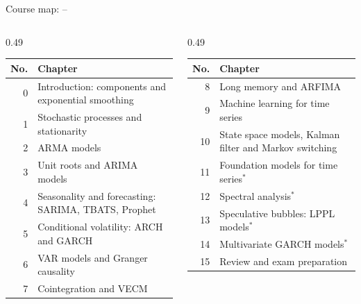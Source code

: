 \begin{frame}{Course map: --}
\itemsize{\footnotesize}
\begin{columns}[T]
\begin{column}{0.49\textwidth}
\begin{center}
\footnotesize
\begin{tabular}{r>{\raggedright\arraybackslash}p{5.6cm}}
\toprule
\textbf{No.} & \textbf{Chapter} \\
\midrule
0 & Introduction: components and exponential smoothing \\
1 & Stochastic processes and stationarity \\
2 & ARMA models \\
3 & Unit roots and ARIMA models \\
4 & Seasonality and forecasting: SARIMA, TBATS, Prophet \\
5 & Conditional volatility: ARCH and GARCH \\
6 & VAR models and Granger causality \\
7 & Cointegration and VECM \\
\bottomrule
\end{tabular}
\end{center}

\end{column}
\begin{column}{0.49\textwidth}
\begin{center}
\footnotesize
\begin{tabular}{r>{\raggedright\arraybackslash}p{5.6cm}}
\toprule
\textbf{No.} & \textbf{Chapter} \\
\midrule
8 & Long memory and ARFIMA \\
9 & Machine learning for time series \\
10 & State space models, Kalman filter and Markov switching \\
11 & Foundation models for time series$^*$ \\
12 & Spectral analysis$^*$ \\
13 & Speculative bubbles: LPPL models$^*$ \\
14 & Multivariate GARCH models$^*$ \\
15 & Review and exam preparation \\
\bottomrule
\end{tabular}
\end{center}


\end{column}
\end{columns}
\end{frame}
